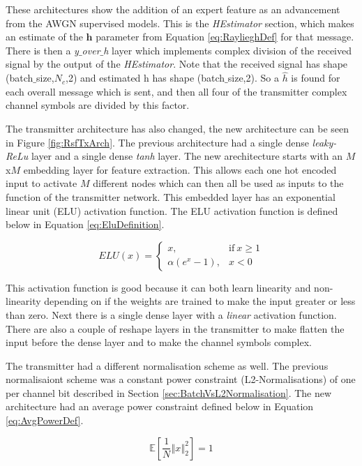 \documentclass[12pt,onecolumn,letterpaper]{article}
\newcommand{\code}{\textit}
\begin{document}
These architectures show the addition of an expert feature as an advancement from the AWGN supervised models. This is the \code{HEstimator} section, which makes an estimate of the $\mathbf{h}$ parameter from Equation \ref{eq:RaylieghDef} for that message. There is then a \code{y$\_$over$\_$h} layer which implements complex division of the received signal by the output of the \code{HEstimator}. Note that the received signal has shape (batch$\_$size,$N_c$,2) and estimated h has shape (batch$\_$size,2). So a $\hat{h}$ is found for each overall message which is sent, and then all four of the transmitter complex channel symbols are divided by this factor. 

The transmitter architecture has also changed, the new architecture can be seen in Figure \ref{fig:RsfTxArch}. The previous architecture had a single dense \code{leaky-ReLu} layer and a single dense \code{tanh} layer. The new arechitecture starts with an $M$x$M$ embedding layer for feature extraction. This allows each one hot encoded input to activate $M$ different nodes which can then all be used as inputs to the function of the transmitter network. This embedded layer has an exponential linear unit (ELU) activation function. The ELU activation function is defined below in Equation \ref{eq:EluDefinition}.


\begin{equation}
   ELU(x)=
   \begin{cases}
     x, & \text{if}\ x\geq1 \\
     \alpha(e^x-1), & x<0
   \end{cases}
   \label{eq:EluDefinition}
\end{equation}

This activation function is good because it can both learn linearity and non-linearity depending on if the weights are trained to make the input greater or less than zero. Next there is a single dense layer with a \code{linear} activation function. There are also a couple of reshape layers in the transmitter to make flatten the input before the dense layer and to make the channel symbols complex. 

The transmitter had a different normalisation scheme as well. The previous normalisaiont scheme was a constant power constraint (L2-Normalisations) of one  per channel bit described in Section \ref{sec:BatchVsL2Normalisation}. The new architecture had an average power constraint defined below in Equation \ref{eq:AvgPowerDef}.

\begin{equation}
   \mathbb{E}\left[\frac{1}{N}\left\Vert x\right\Vert_2^2\right] = 1
   \label{eq:AvgPowerDef}
\end{equation}
\end{document}
